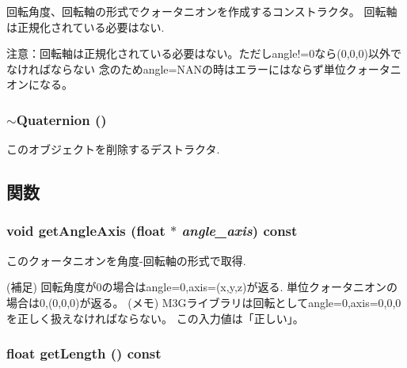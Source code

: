 回転角度、回転軸の形式でクォータニオンを作成するコンストラクタ。 回転軸は正規化されている必要はない.

注意：回転軸は正規化されている必要はない。ただしangle!=0なら(0,0,0)以外でなければならない 念のためangle=NANの時はエラーにはならず単位クォータニオンになる。 \hypertarget{classm3g_1_1Quaternion_6e9a147677b9ffd583c59e9d06c3d938}{
\subsubsection[{$\sim$Quaternion}]{\setlength{\rightskip}{0pt plus 5cm}$\sim${\bf Quaternion} ()}}
\label{classm3g_1_1Quaternion_6e9a147677b9ffd583c59e9d06c3d938}


このオブジェクトを削除するデストラクタ. 

\subsection{関数}
\hypertarget{classm3g_1_1Quaternion_3049675269aef6bb333d8f83fdf6eed7}{
\subsubsection[{getAngleAxis}]{\setlength{\rightskip}{0pt plus 5cm}void getAngleAxis (float $\ast$ {\em angle\_\-axis}) const}}
\label{classm3g_1_1Quaternion_3049675269aef6bb333d8f83fdf6eed7}


このクォータニオンを角度-回転軸の形式で取得.

(補足) 回転角度が0の場合はangle=0,axis=(x,y,z)が返る. 単位クォータニオンの場合は0,(0,0,0)が返る。 (メモ) M3Gライブラリは回転としてangle=0,axis=0,0,0を正しく扱えなければならない。 この入力値は「正しい」。 \hypertarget{classm3g_1_1Quaternion_b4393f1928cea2a3baadbf9acdd99de2}{
\subsubsection[{getLength}]{\setlength{\rightskip}{0pt plus 5cm}float getLength () const}}
\label{classm3g_1_1Quaternion_b4393f1928cea2a3baadbf9acdd99de2}



